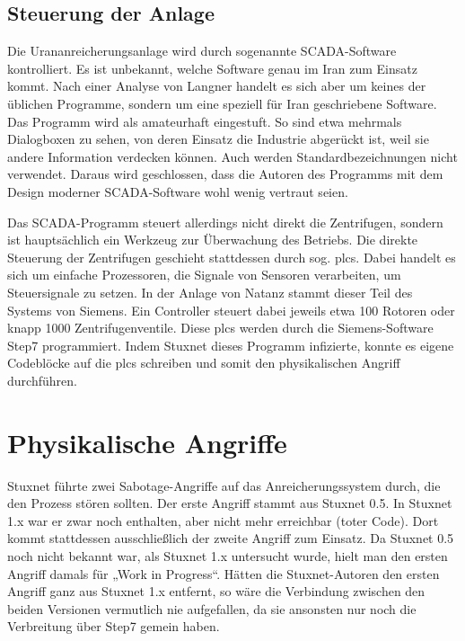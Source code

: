 \documentclass[a4paper]{article}
\begin{document}
\subsection{Steuerung der Anlage}

Die Urananreicherungsanlage wird durch sogenannte SCADA-Software kontrolliert.
Es ist unbekannt, welche Software genau im Iran zum Einsatz kommt.
Nach einer Analyse von Langner\cite{tkac} handelt es sich aber um keines der üblichen Programme,
sondern um eine speziell für Iran geschriebene Software.
Das Programm wird als amateurhaft eingestuft.
So sind etwa mehrmals Dialogboxen zu sehen, von deren Einsatz die Industrie abgerückt ist, weil sie andere Information verdecken können.
Auch werden Standardbezeichnungen nicht verwendet.
Daraus wird geschlossen, dass die Autoren des Programms mit dem Design moderner SCADA-Software wohl wenig vertraut seien.

Das SCADA-Programm steuert allerdings nicht direkt die Zentrifugen,
sondern ist hauptsächlich ein Werkzeug zur Überwachung des Betriebs. %
Die direkte Steuerung der Zentrifugen geschieht stattdessen durch sog. \glspl{plc}.
Dabei handelt es sich um einfache Prozessoren, die Signale von Sensoren verarbeiten,
um Steuersignale zu setzen.
In der Anlage von Natanz stammt dieser Teil des Systems von Siemens.
Ein Controller steuert dabei jeweils etwa 100 Rotoren oder knapp 1000 Zentrifugenventile.
Diese \glspl{plc} werden durch die Siemens-Software Step7 programmiert.
Indem Stuxnet dieses Programm infizierte, konnte es eigene Codeblöcke auf die \glspl{plc} schreiben
und somit den physikalischen Angriff durchführen.

\section{Physikalische Angriffe}

Stuxnet führte zwei Sabotage-Angriffe auf das Anreicherungssystem durch, die den Prozess stören sollten.
Der erste Angriff stammt aus Stuxnet 0.5.
In Stuxnet 1.x war er zwar noch enthalten, aber nicht mehr erreichbar (toter Code).
Dort kommt stattdessen ausschließlich der zweite Angriff zum Einsatz.
Da Stuxnet 0.5 noch nicht bekannt war, als Stuxnet 1.x untersucht wurde,
hielt man den ersten Angriff damals für „Work in Progress“.\cite{dossier}
Hätten die Stuxnet-Autoren den ersten Angriff ganz aus Stuxnet 1.x entfernt,
so wäre die Verbindung zwischen den beiden Versionen vermutlich nie aufgefallen,
da sie ansonsten nur noch die Verbreitung über Step7 gemein haben.\cite{05}
\end{document}
